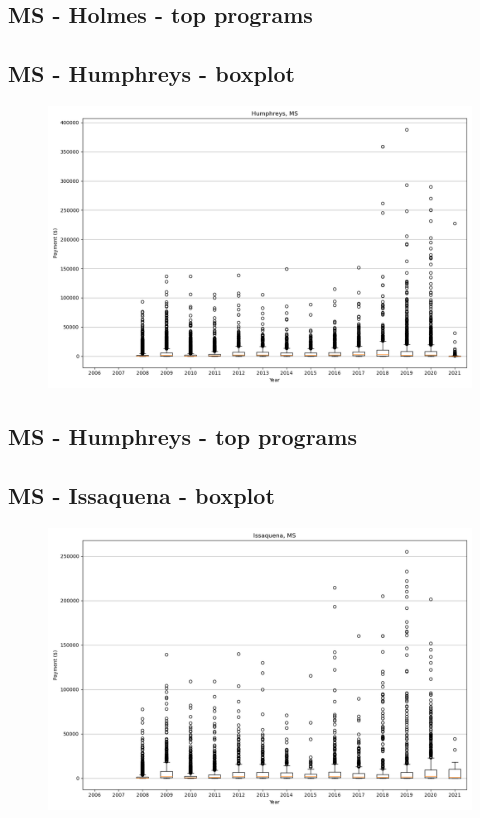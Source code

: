 \subsection*{MS - Holmes - top programs}

\newpage
\subsection*{MS - Humphreys - boxplot}
\begin{figure}[h]
\centering
\includegraphics[width=7in]{../output/boxplots/counties/Humphreys-MS_boxplot.png}
\end{figure}


\subsection*{MS - Humphreys - top programs}

\newpage
\subsection*{MS - Issaquena - boxplot}
\begin{figure}[h]
\centering
\includegraphics[width=7in]{../output/boxplots/counties/Issaquena-MS_boxplot.png}
\end{figure}


